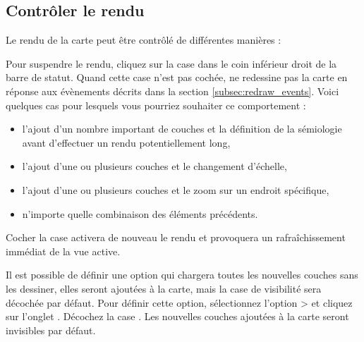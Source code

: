 \subsection{Contrôler le rendu} \label{label_controlmap}

Le rendu de la carte peut être contrôlé de différentes manières :

 
\label{label_suspendrender}

Pour suspendre le rendu, cliquez sur la case dans le coin inférieur droit de la barre de statut. Quand cette case n'est pas cochée, \qg ne redessine pas la carte en réponse aux évènements décrits dans la section \ref{subsec:redraw_events}. Voici quelques cas pour lesquels vous pourriez souhaiter ce comportement :

\begin{itemize}[label=--]
\item l'ajout d'un nombre important de couches et la définition de la sémiologie avant d'effectuer un rendu potentiellement long,
\item l'ajout d'une ou plusieurs couches et le changement d'échelle,
\item l'ajout d'une ou plusieurs couches et le zoom sur un endroit spécifique,
\item n'importe quelle combinaison des éléments précédents.
\end{itemize}

Cocher la case  activera de nouveau le rendu et provoquera un rafraîchissement immédiat de la vue active.

 \label{label_settinglayer}
 

Il est possible de définir une option qui chargera toutes les nouvelles couches 
sans les dessiner, elles seront ajoutées à la carte, mais la case de visibilité 
sera décochée par défaut. Pour définir cette option, sélectionnez l'option 
 >  et cliquez sur l'onglet 
. Décochez la case . Les nouvelles couches ajoutées à la carte seront invisibles 
par défaut.

%
%
%
\label{label_updatemap} 

